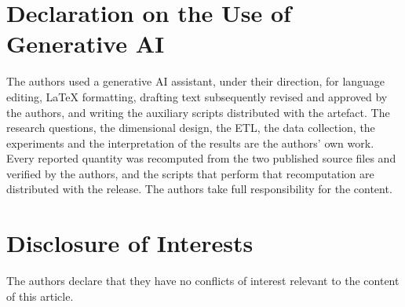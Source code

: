 \documentclass[runningheads]{llncs}
\newif\ifmarcarcambios
\newenvironment{icokgblock}{\ifmarcarcambios\color{nuevo}\fi}{}
\renewcommand{\_}{\origunderscore\allowbreak}
\begin{document}
\begin{icokgblock}
\section*{Declaration on the Use of Generative AI}

The authors used a generative AI assistant, under their direction, for language
editing, \LaTeX{} formatting, drafting text subsequently revised and approved by
the authors, and writing the auxiliary scripts distributed with the artefact. The
research questions, the dimensional design, the ETL, the data collection, the
experiments and the interpretation of the results are the authors' own work.
Every reported quantity was recomputed from the two published source files and
verified by the authors, and the scripts that perform that recomputation are
distributed with the release. The authors take full responsibility for the
content.
\end{icokgblock}

\section*{Disclosure of Interests}
The authors declare that they have no conflicts of interest relevant to the content of this article.

\end{document}
